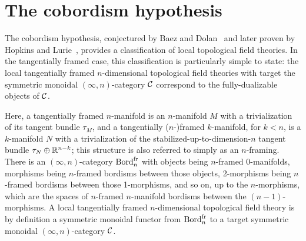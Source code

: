 \documentclass{amsart}
\begin{document}









\appendix
\section{The cobordism hypothesis}

The cobordism hypothesis, conjectured by Baez and Dolan~\cite{MR1355899} and later proven by Hopkins and Lurie~\cite{lurie-ch}, provides a classification of local topological field theories.  In the tangentially framed case, this classification is particularly simple to state: the local tangentially framed $n$-dimensional topological field theories with target the symmetric monoidal $(\infty,n)$-category $\mathcal C$ correspond to the fully-dualizable objects of $\mathcal C$.  

Here, a tangentially framed $n$-manifold is an $n$-manifold $M$ with a trivialization of its tangent bundle $\tau_M$, and a tangentially ($n$-)framed $k$-manifold, for $k < n$, is a $k$-manifold $N$ with a trivialization of the stabilized-up-to-dimension-$n$ tangent bundle $\tau_N \oplus \mathbb R^{n-k}$; this structure is also referred to simply as an $n$-framing.  There is an $(\infty,n)$-category $\mathrm{Bord}^\mathrm{fr}_n$ with objects being $n$-framed $0$-manifolds, morphisms being $n$-framed bordisms between those objects, 2-morphisms being $n$-framed bordisms between those 1-morphisms, and so on, up to the $n$-morphisms, which are the spaces of $n$-framed $n$-manifold bordisms between the $(n-1)$-morphisms.  A local tangentially framed $n$-dimensional topological field theory is by definition a symmetric monoidal functor from $\mathrm{Bord}^\mathrm{fr}_n$ to a target symmetric monoidal $(\infty,n)$-category $\mathcal C$.
\end{document}
